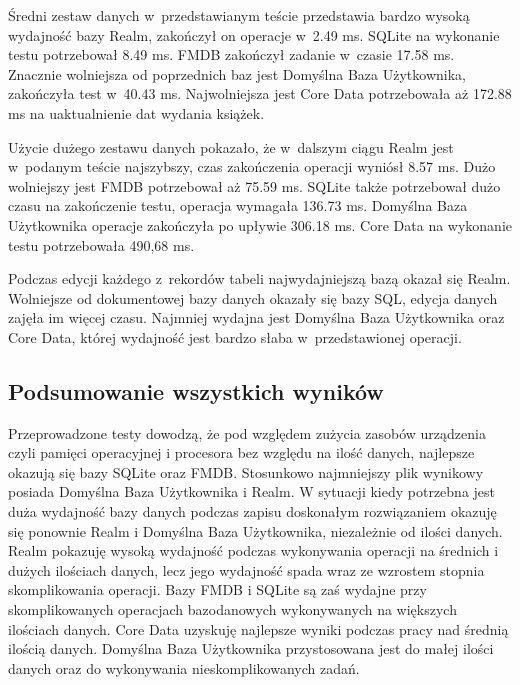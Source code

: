Średni zestaw danych w~przedstawianym teście przedstawia bardzo wysoką wydajność bazy Realm, zakończył on operacje w~2.49 ms. SQLite na wykonanie testu potrzebował 8.49 ms. FMDB zakończył zadanie w~czasie 17.58 ms. Znacznie wolniejsza od poprzednich baz jest Domyślna Baza Użytkownika, zakończyła test w~40.43 ms. Najwolniejsza jest Core Data potrzebowała aż 172.88  ms na uaktualnienie dat wydania książek.

Użycie dużego zestawu danych pokazało, że w~dalszym ciągu Realm jest w~podanym teście najszybszy, czas zakończenia operacji wyniósł 8.57 ms. Dużo wolniejszy jest FMDB potrzebował aż 75.59 ms. SQLite także potrzebował dużo czasu na zakończenie testu, operacja wymagała 136.73 ms. Domyślna Baza Użytkownika operacje zakończyła po upływie 306.18 ms. Core Data na wykonanie testu potrzebowała 490,68 ms. 

Podczas edycji każdego z~rekordów tabeli najwydajniejszą bazą okazał się Realm. Wolniejsze od dokumentowej bazy danych okazały się bazy SQL, edycja danych zajęła im więcej czasu. Najmniej wydajna jest Domyślna Baza Użytkownika oraz Core Data, której wydajność jest bardzo słaba w~przedstawionej operacji. 

\subsection{Podsumowanie wszystkich wyników}

Przeprowadzone testy dowodzą, że pod względem zużycia zasobów urządzenia czyli pamięci operacyjnej i procesora bez względu na ilość danych, najlepsze okazują się bazy SQLite oraz FMDB. Stosunkowo najmniejszy plik wynikowy posiada Domyślna Baza Użytkownika i Realm. W sytuacji kiedy potrzebna jest duża wydajność bazy danych podczas zapisu doskonałym rozwiązaniem okazuję się ponownie Realm i Domyślna Baza Użytkownika, niezależnie od ilości danych. Realm pokazuję wysoką wydajność podczas wykonywania operacji na średnich i dużych ilościach danych, lecz jego wydajność spada wraz ze wzrostem stopnia skomplikowania operacji. Bazy FMDB i SQLite są zaś wydajne przy skomplikowanych operacjach bazodanowych wykonywanych na większych ilościach danych. Core Data uzyskuję najlepsze wyniki podczas pracy nad średnią ilością danych. Domyślna Baza Użytkownika przystosowana jest do małej ilości danych oraz do wykonywania nieskomplikowanych zadań.